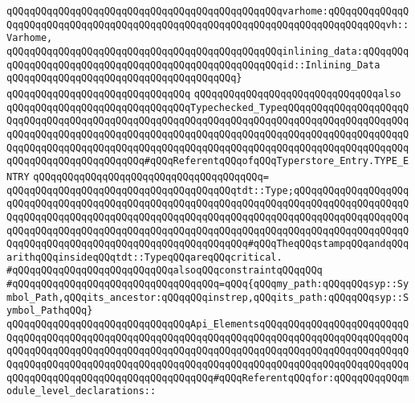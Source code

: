\verb|qQQqqQQqqQQqqQQqqQQqqQQqqQQqqQQqqQQqqQQqqQQqqQQqvarhome:qQQqqQQqqQQqqQQqqQQqqQQqqQQqqQQqqQQqqQQqqQQqqQQqqQQqqQQqqQQqqQQqqQQqqQQqqQQqqQQqvh::Varhome,|\newline
\verb|qQQqqQQqqQQqqQQqqQQqqQQqqQQqqQQqqQQqqQQqqQQqqQQqinlining_data:qQQqqQQqqQQqqQQqqQQqqQQqqQQqqQQqqQQqqQQqqQQqqQQqqQQqqQQqid::Inlining_Data|\newline
\verb|qQQqqQQqqQQqqQQqqQQqqQQqqQQqqQQqqQQqqQQq}|\newline
\newline
\verb|qQQqqQQqqQQqqQQqqQQqqQQqqQQqqQQq|\newline
\verb|qQQqqQQqqQQqqQQqqQQqqQQqqQQqqQQqalso|\newline
\verb|qQQqqQQqqQQqqQQqqQQqqQQqqQQqqQQqTypechecked_TypeqQQqqQQqqQQqqQQqqQQqqQQqqQQqqQQqqQQqqQQqqQQqqQQqqQQqqQQqqQQqqQQqqQQqqQQqqQQqqQQqqQQqqQQqqQQqqQQqqQQqqQQqqQQqqQQqqQQqqQQqqQQqqQQqqQQqqQQqqQQqqQQqqQQqqQQqqQQqqQQqqQQqqQQqqQQqqQQqqQQqqQQqqQQqqQQqqQQqqQQqqQQqqQQqqQQqqQQqqQQqqQQqqQQqqQQqqQQqqQQqqQQqqQQqqQQqqQQq#qQQqReferentqQQqofqQQqTyperstore_Entry.TYPE_ENTRY|\newline
\verb|qQQqqQQqqQQqqQQqqQQqqQQqqQQqqQQqqQQqqQQq=|\newline
\verb|qQQqqQQqqQQqqQQqqQQqqQQqqQQqqQQqqQQqqQQqtdt::Type;qQQqqQQqqQQqqQQqqQQqqQQqqQQqqQQqqQQqqQQqqQQqqQQqqQQqqQQqqQQqqQQqqQQqqQQqqQQqqQQqqQQqqQQqqQQqqQQqqQQqqQQqqQQqqQQqqQQqqQQqqQQqqQQqqQQqqQQqqQQqqQQqqQQqqQQqqQQqqQQqqQQqqQQqqQQqqQQqqQQqqQQqqQQqqQQqqQQqqQQqqQQqqQQqqQQqqQQqqQQqqQQqqQQqqQQqqQQqqQQqqQQqqQQqqQQqqQQqqQQqqQQqqQQqqQQq#qQQqTheqQQqstampqQQqandqQQqarithqQQqinsideqQQqtdt::TypeqQQqareqQQqcritical.|\newline
\newline
\newline
\newline
\verb|#qQQqqQQqqQQqqQQqqQQqqQQqqQQqalsoqQQqconstraintqQQqqQQq|\newline
\verb|#qQQqqQQqqQQqqQQqqQQqqQQqqQQqqQQqqQQq=qQQq{qQQqmy_path:qQQqqQQqsyp::Symbol_Path,qQQqits_ancestor:qQQqqQQqinstrep,qQQqits_path:qQQqqQQqsyp::Symbol_PathqQQq}|\newline
\newline
\newline
\verb|qQQqqQQqqQQqqQQqqQQqqQQqqQQqqQQqApi_ElementsqQQqqQQqqQQqqQQqqQQqqQQqqQQqqQQqqQQqqQQqqQQqqQQqqQQqqQQqqQQqqQQqqQQqqQQqqQQqqQQqqQQqqQQqqQQqqQQqqQQqqQQqqQQqqQQqqQQqqQQqqQQqqQQqqQQqqQQqqQQqqQQqqQQqqQQqqQQqqQQqqQQqqQQqqQQqqQQqqQQqqQQqqQQqqQQqqQQqqQQqqQQqqQQqqQQqqQQqqQQqqQQqqQQqqQQqqQQqqQQqqQQqqQQqqQQqqQQqqQQqqQQqqQQqqQQq#qQQqReferentqQQqfor:qQQqqQQqqQQqmodule_level_declarations::|\newline
